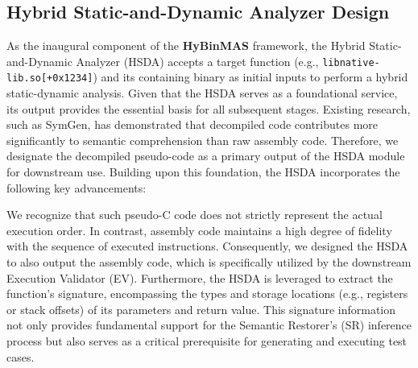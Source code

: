 \documentclass[acmsmall,screen,review,anonymous]{acmart} %
\begin{document}


\subsection{Hybrid Static-and-Dynamic Analyzer Design}
\label{sec:hsda_design}

As the inaugural component of the \textbf{HyBinMAS} framework, the Hybrid Static-and-Dynamic Analyzer (HSDA) accepts a target function (e.g., \texttt{libnative-lib.so[+0x1234]}) and its containing binary as initial inputs to perform a hybrid static-dynamic analysis. Given that the HSDA serves as a foundational service, its output provides the essential basis for all subsequent stages. Existing research, such as SymGen, has demonstrated that decompiled code contributes more significantly to semantic comprehension than raw assembly code. Therefore, we designate the decompiled pseudo-code as a primary output of the HSDA module for downstream use. Building upon this foundation, the HSDA incorporates the following key advancements:

We recognize that such pseudo-C code does not strictly represent the actual execution order. In contrast, assembly code maintains a high degree of fidelity with the sequence of executed instructions. Consequently, we designed the HSDA to also output the assembly code, which is specifically utilized by the downstream Execution Validator (EV). Furthermore, the HSDA is leveraged to extract the function's signature, encompassing the types and storage locations (e.g., registers or stack offsets) of its parameters and return value. This signature information not only provides fundamental support for the Semantic Restorer's (SR) inference process but also serves as a critical prerequisite for generating and executing test cases.
\end{document}
